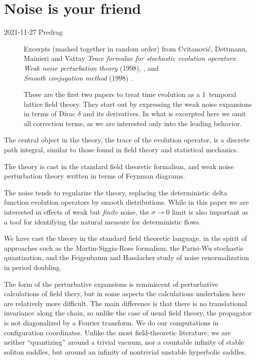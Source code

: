 \newpage
\section{Noise is your friend}
\label{sect:noise}

\begin{description}
  \item[2021-11-27 Predrag]
Excerpts (mashed together in random order) from
Cvitanovi{\'c}, Dettmann, Mainieri and Vattay
  {\em Trace formulae for stochastic evolution operators}:
\\
{\em {Weak} noise perturbation theory} (1998),
,
and
\\
{\em {Smooth} conjugation method} (1998)
.

These are the first two papers to treat time evolution
as a 1\dmn\ temporal lattice field theory.
They start out by
expressing the weak noise expansions in terms of Dirac $\delta$ and its
derivatives. In what is excerpted here we omit all correction terms, as we
are interested only into the leading behavior.
\end{description}


The central object in the theory, the trace of the evolution operator,
is a discrete path integral, similar to those found in field theory
and statistical mechanics.

The theory is cast in the standard field
theoretic formalism, and weak noise perturbation theory written in terms of
Feynman diagrams.

The noise
tends to regularize the theory, replacing the deterministic delta function
evolution operators by smooth distributions.
While in this paper we are interested in effects of weak but
{\em finite} noise,
the $\sigma \to 0$ limit is also important as a tool for identifying
the natural measure for deterministic flows.

We have cast the theory in the standard field theoretic
language, in the spirit of approaches such as the
Martin-Siggia-Rose formalism, the Parisi-Wu
stochastic quantization, and the
Feigenbaum and  Hasslacher study of noise renormalization
in period doubling.

The form of the perturbative expansions  %
is reminiscent of perturbative calculations
of field thery, but in some aspects the
calculations undertaken here are relatively more difficult.
The main difference is that there is
no translational invariance along the chain, so unlike the case of
usual field theory,
the propagator is not diagonalized by a Fourier transform. We
do our computations in configuration coordinates.
Unlike the most field-theoretic literature,
we are neither ``quantizing'' around a trivial vacuum,
nor a countable infinity of stable soliton saddles, but around an
infinity of nontrivial unstable hyperbolic saddles.


